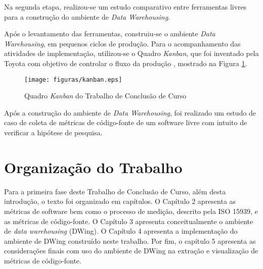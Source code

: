 Na segunda etapa, realizou-se um estudo comparativo entre ferramentas livres para a construção do ambiente de \textit{Data Warehousing}. 

Após o levantamento das ferramentas, construiu-se o ambiente \textit{Data Warehousing}, em pequenos ciclos de produção. Para o acompanhamento das atividades de implementação, utilizou-se o Quadro \textit{Kanban}, que foi inventado pela Toyota com objetivo de controlar o fluxo da produção \cite{moura1999kanban}, mostrado na Figura \ref{kanban}.



\begin{figure}[ht!]
\centering
\texttt{[image: figuras/kanban.eps]}
\caption{Quadro \textit{Kanban} do Trabalho de Conclusão de Curso}
         \label{kanban}
\end{figure}
\FloatBarrier

Após a construção do ambiente de \textit{Data Warehousing}, foi realizado um estudo de caso de coleta de métricas de código-fonte de um software livre com intuito de verificar a hipótese de pesquisa.


\section{Organização do Trabalho}

Para a primeira fase deste Trabalho de Conclusão de Curso, além desta 
introdução, o texto foi organizado em capítulos. O Capítulo 2 apresenta as 
métricas de software bem como o processo de medição, descrito pela ISO 15939, 
e as métricas de código-fonte. O Capítulo 3 apresenta conceitualmente o ambiente de \textit{data warehousing} (DWing). O 
Capítulo 4 apresenta a implementação do ambiente de DWing construído neste 
trabalho. Por fim, o capítulo 5 apresenta as considerações finais com uso do 
ambiente de DWing na extração e visualização de métricas de código-fonte. 
